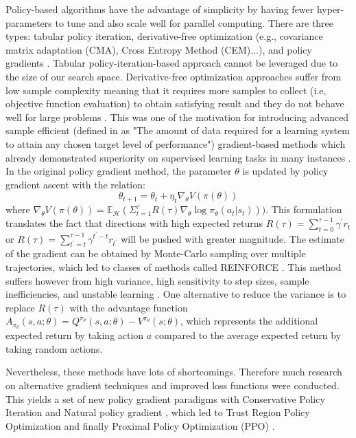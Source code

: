 \documentclass[a4paper]{article}
\begin{document}
Policy-based algorithms have the advantage of simplicity by having fewer hyper-parameters to tune and also scale well for parallel computing. There are three types: tabular policy iteration, derivative-free optimization (e.g., covariance matrix adaptation (CMA), Cross Entropy Method (CEM)...), and policy gradients \cite{schulman2017trust}. Tabular policy-iteration-based approach cannot be leveraged due to the size of our search space. Derivative-free optimization approaches suffer from low sample complexity meaning that it requires more samples to collect (i.e, objective function evaluation) to obtain satisfying result and they do not behave well for large problems \cite{schulman2017trust}. This was one of the motivation for introducing advanced sample efficient (defined in \cite{botvinick2019reinforcement} as "The amount of data required for a learning system to attain any chosen target level of performance") gradient-based methods which already demonstrated superiority on supervised learning tasks in many instances \cite{schulman2017trust}.
In the original policy gradient method, the parameter $\theta$ is updated by policy gradient ascent with the relation:
\begin{equation}
    \theta_{t+1} = \theta_t + \eta_t \nabla_{\theta}V(\pi(\theta))
    \label{eq:policygradientupdates}
\end{equation}
where $\nabla_{\theta}V(\pi(\theta)) = \mathbb{E}_{\mathcal{H}}( \Sigma_{t = 1}^{\tau}R(\tau) \nabla_{\theta} \log \pi_{\theta}(a_t|s_t)))$. This formulation translates the fact that directions with high expected returns $R(\tau) = \sum_{t = 0}^{\tau - 1} \gamma^{'}r_t$ or $R(\tau) = \sum_{t^{'} = t}^{\tau - 1} \gamma^{t^{'}-t}r_{t^{'}}$ will be pushed with greater magnitude. The estimate of the gradient can be obtained by Monte-Carlo sampling over multiple trajectories, which led to classes of methods called REINFORCE \cite{williams1992simple}. This method suffers however from high variance, high sensitivity to step sizes, sample inefficiencies, and unstable learning \cite{wu2017scalable}.  One alternative to reduce the variance is to replace $R(\tau)$ with the advantage function $A_{\pi_{\theta}}(s,a;\theta) = Q^{\pi_{\theta}}(s,a;\theta) - V^{\pi_{\theta}}(s;\theta)$, which represents the additional expected return by taking action $a$ compared to the average expected return by taking random actions. 

Nevertheless, these methods have lots of shortcomings. Therefore much research on alternative gradient techniques and improved loss functions were conducted. This yields a set of new policy gradient paradigms with Conservative Policy Iteration \cite{kakade2002approximately} and Natural policy gradient \cite{kakade2001anatural}, which led to Trust Region Policy Optimization \cite{schulman2017trust} and finally Proximal Policy Optimization (PPO) \cite{schulman2017proximal}. 
\end{document}
